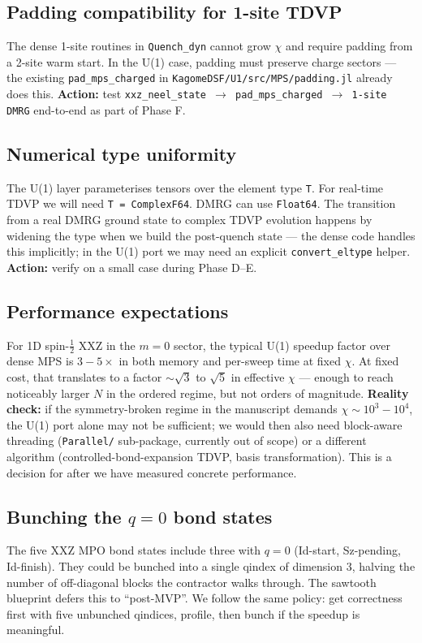 \documentclass[11pt]{article}
\begin{document}
\subsection{Padding compatibility for 1-site TDVP}
The dense 1-site routines in \texttt{Quench\_dyn} cannot grow $\chi$ and
require padding from a 2-site warm start.  In the U(1) case, padding must
preserve charge sectors --- the existing \texttt{pad\_mps\_charged} in
\texttt{KagomeDSF/U1/src/MPS/padding.jl} already does this.  \textbf{Action:}
test \texttt{xxz\_neel\_state $\to$ pad\_mps\_charged $\to$ 1-site DMRG}
end-to-end as part of Phase F.

\subsection{Numerical type uniformity}
The U(1) layer parameterises tensors over the element type \texttt{T}.
For real-time TDVP we will need \texttt{T = ComplexF64}.  DMRG can use
\texttt{Float64}.  The transition from a real DMRG ground state to complex
TDVP evolution happens by widening the type when we build the post-quench
state --- the dense code handles this implicitly; in the U(1) port we may
need an explicit \texttt{convert\_eltype} helper.  \textbf{Action:} verify
on a small case during Phase D--E.

\subsection{Performance expectations}
For 1D spin-$\tfrac12$ XXZ in the $m=0$ sector, the typical U(1) speedup
factor over dense MPS is $3\!-\!5\times$ in both memory and per-sweep time
at fixed $\chi$.  At fixed cost, that translates to a factor $\sim\sqrt{3}$
to $\sqrt{5}$ in effective $\chi$ --- enough to reach noticeably larger
$N$ in the ordered regime, but not orders of magnitude.  \textbf{Reality
check:} if the symmetry-broken regime in the manuscript demands
$\chi \sim 10^3\!-\!10^4$, the U(1) port alone may not be sufficient; we
would then also need block-aware threading
(\texttt{Parallel/} sub-package, currently out of scope) or a different
algorithm (controlled-bond-expansion TDVP, basis transformation).  This is
a decision for after we have measured concrete performance.

\subsection{Bunching the $q=0$ bond states}
The five XXZ MPO bond states include three with $q=0$ (Id-start, Sz-pending,
Id-finish).  They could be bunched into a single qindex of dimension 3,
halving the number of off-diagonal blocks the contractor walks through.  The
sawtooth blueprint defers this to ``post-MVP''.  We follow the same policy:
get correctness first with five unbunched qindices, profile, then bunch if
the speedup is meaningful.
\end{document}
